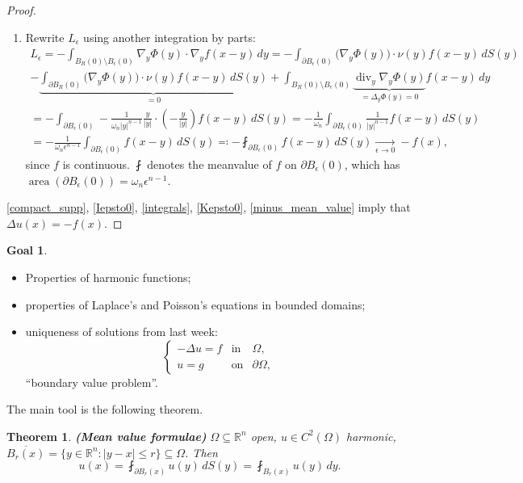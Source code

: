 \documentclass[12pt]{article}
\DeclareMathOperator{\diver}{div}
\DeclareMathOperator{\area}{area}
\newtheorem{theorem}{Theorem}[section]
\theoremstyle{definition}
\newtheorem*{goal}{Goal}
\begin{document}
\begin{proof}
\begin{enumerate}[label=\arabic*.]
\item Rewrite $L_{\epsilon}$ using another integration by parts:
\begin{multline}\tag{5}\label{minus_mean_value}
L_{\epsilon}=-\int_{B_R(0)\setminus B_{\epsilon}(0)}\nabla_y\Phi(y)\cdot\nabla_yf(x-y)\,dy=-\int_{\partial B_{\epsilon}(0)}\big(\nabla_y\Phi(y)\big)\cdot\nu(y)f(x-y)\,dS(y)\\
-\underbrace{\int_{\partial B_R(0)}\big(\nabla_y\Phi(y)\big)\cdot\nu(y)f(x-y)\,dS(y)}_{=0}+\int_{B_R(0)\setminus B_{\epsilon}(0)}\underbrace{\diver_y\nabla_y\Phi(y)}_{=\Delta_y\Phi(y)=0}f(x-y)\,dy\\
=-\int_{\partial B_{\epsilon}(0)}-\frac{1}{\omega_n|y|^{n-1}}\frac{y}{|y|}\cdot\left(-\frac{y}{|y|}\right)f(x-y)\,dS(y)=-\frac{1}{\omega_n}\int_{\partial B_{\epsilon}(0)}\frac{1}{|y|^{n-1}}f(x-y)\,dS(y)\\
=-\frac{1}{\omega_n\epsilon^{n-1}}\int_{\partial B_{\epsilon}(0)}f(x-y)\,dS(y)\eqqcolon-\fint_{\partial B_{\epsilon}(0)}f(x-y)\,dS(y)\xrightarrow[\epsilon\to0]{}-f(x),
\end{multline}
since $f$ is continuous. $\fint$ denotes the meanvalue of $f$ on $\partial B_{\epsilon}(0)$, which has $\area(\partial B_{\epsilon}(0))=\omega_n\epsilon^{n-1}$.
\end{enumerate}

\ref{compact_supp}, \ref{Iepsto0}, \ref{integrals}, \ref{Kepsto0}, \eqref{minus_mean_value} imply that $\Delta u(x)=-f(x)$.
\end{proof}

\begin{goal}
\begin{itemize}
\item Properties of harmonic functions;
\item properties of Laplace's and Poisson's equations in bounded domains;
\item uniqueness of solutions from last week:
\[\left\{\begin{array}{lll}-\Delta u=f&\text{in}&\Omega,\\u=g&\text{on}&\partial\Omega,\end{array}\right.\]
``boundary value problem''.
\end{itemize}
\end{goal}

The main tool is the following theorem.

\begin{theorem}
\emph{\textbf{(Mean value formulae)}} $\Omega\subseteq\mathbb{R}^n$ open, $u\in C^2(\Omega)$ harmonic, $\overline{B_r(x)}=\{y\in\mathbb{R}^n:|y-x|\leq r\}\subseteq\Omega$. Then
\[u(x)=\fint_{\partial B_r(x)}u(y)\,dS(y)=\fint_{B_r(x)}u(y)\,dy.\]
\end{theorem}
\end{document}
